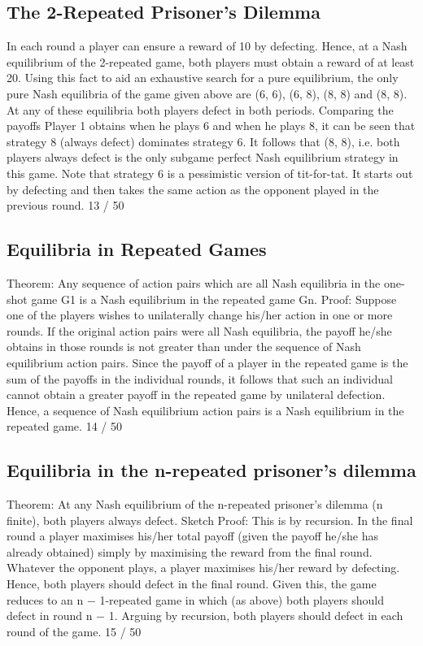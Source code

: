 \documentclass[]{report}
\begin{document}
\subsection{The 2-Repeated Prisoner’s Dilemma}
In each round a player can ensure a reward of 10 by defecting.
Hence, at a Nash equilibrium of the 2-repeated game, both players
must obtain a reward of at least 20.
Using this fact to aid an exhaustive search for a pure equilibrium,
the only pure Nash equilibria of the game given above are (6, 6),
(6, 8), (8, 8) and (8, 8). At any of these equilibria both players
defect in both periods.
Comparing the payoffs Player 1 obtains when he plays 6 and when
he plays 8, it can be seen that strategy 8 (always defect) dominates
strategy 6. It follows that (8, 8), i.e. both players always defect is
the only subgame perfect Nash equilibrium strategy in this game.
Note that strategy 6 is a pessimistic version of tit-for-tat. It starts
out by defecting and then takes the same action as the opponent
played in the previous round.
13 / 50
\subsection{Equilibria in Repeated Games}
Theorem: Any sequence of action pairs which are all Nash
equilibria in the one-shot game G1 is a Nash equilibrium in the
repeated game Gn.
Proof: Suppose one of the players wishes to unilaterally change
his/her action in one or more rounds.
If the original action pairs were all Nash equilibria, the payoff
he/she obtains in those rounds is not greater than under the
sequence of Nash equilibrium action pairs.
Since the payoff of a player in the repeated game is the sum of the
payoffs in the individual rounds, it follows that such an individual
cannot obtain a greater payoff in the repeated game by unilateral
defection. Hence, a sequence of Nash equilibrium action pairs is a
Nash equilibrium in the repeated game.
14 / 50
\subsection{Equilibria in the n-repeated prisoner’s dilemma}
Theorem: At any Nash equilibrium of the n-repeated prisoner’s
dilemma (n finite), both players always defect.
Sketch Proof: This is by recursion. In the final round a player
maximises his/her total payoff (given the payoff he/she has already
obtained) simply by maximising the reward from the final round.
Whatever the opponent plays, a player maximises his/her reward
by defecting. Hence, both players should defect in the final round.
Given this, the game reduces to an n − 1-repeated game in which
(as above) both players should defect in round n − 1. Arguing by
recursion, both players should defect in each round of the game.
15 / 50
\end{document}
